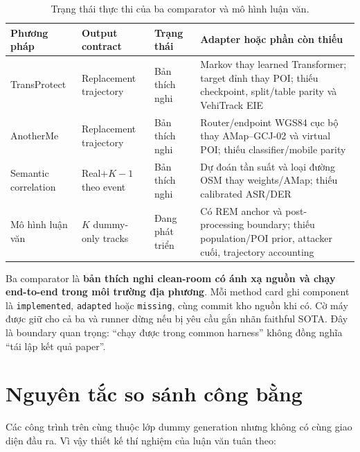 \documentclass[12pt,a4paper,oneside]{report}
\begin{document}
\begin{table}[htbp]
\centering
\small
\caption{Trạng thái thực thi của ba comparator và mô hình luận văn.}
\label{tab:implementation-status}
\begin{tabularx}{\textwidth}{P{2.7cm}P{2.6cm}P{2.6cm}Y}
\toprule
\textbf{Phương pháp} & \textbf{Output contract} & \textbf{Trạng thái} & \textbf{Adapter hoặc phần còn thiếu} \\
\midrule
TransProtect & Replacement trajectory & Bản thích nghi & Markov thay learned Transformer; target đỉnh thay POI; thiếu checkpoint, split/table parity và VehiTrack EIE \\
\addlinespace
AnotherMe & Replacement trajectory & Bản thích nghi & Router/endpoint WGS84 cục bộ thay AMap--GCJ-02 và virtual POI; thiếu classifier/mobile parity \\
\addlinespace
Semantic correlation & Real+$K-1$ theo event & Bản thích nghi & Dự đoán tần suất và loại đường OSM thay weights/AMap; thiếu calibrated ASR/DER \\
\addlinespace
Mô hình luận văn & $K$ dummy-only tracks & Đang phát triển & Có REM anchor và post-processing boundary; thiếu population/POI prior, attacker cuối, trajectory accounting \\
\bottomrule
\end{tabularx}
\end{table}

Ba comparator là \textbf{bản thích nghi clean-room có ánh xạ nguồn và chạy end-to-end trong môi trường địa phương}. Mỗi method card ghi component là \texttt{implemented}, \texttt{adapted} hoặc \texttt{missing}, cùng commit kho nguồn khi có. Cờ máy
 được giữ cho cả ba và runner dừng nếu bị yêu cầu gắn nhãn faithful SOTA. Đây là boundary quan trọng: ``chạy được trong common harness'' không đồng nghĩa ``tái lập kết quả paper''.

\section{Nguyên tắc so sánh công bằng}

Các công trình trên cùng thuộc lớp dummy generation nhưng không có cùng giao diện đầu ra. Vì vậy thiết kế thí nghiệm của luận văn tuân theo:
\end{document}

